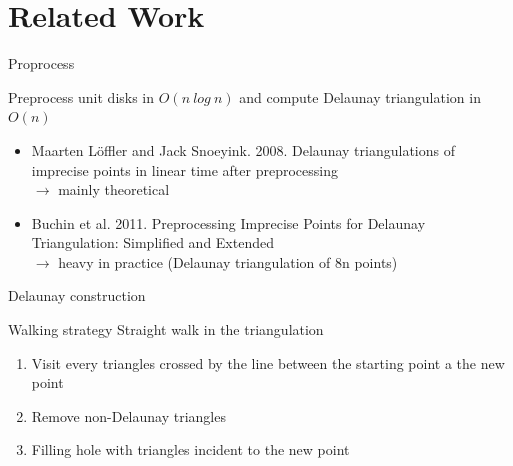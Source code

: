 \documentclass{beamer}
\begin{document}
\section{Related Work}
\frame{\tableofcontents[currentsection]}
\begin{frame}{Proprocess}
 \begin{block}{Preprocess unit disks in $O(n~log~n)$ and compute Delaunay triangulation in $O(n)$}
  \begin{itemize}
   \item Maarten L\"offler and Jack Snoeyink. 2008. Delaunay triangulations of imprecise points in linear time after preprocessing \\
   $\rightarrow$ mainly theoretical 
   \item Buchin et al. 2011. Preprocessing Imprecise Points for Delaunay Triangulation: Simplified and Extended \\
   $\rightarrow$ heavy in practice (Delaunay triangulation of 8n points)
  \end{itemize}
 \end{block}
 
\end{frame}

\begin{frame}{Delaunay construction}
 \begin{block}{Walking strategy}
  Straight walk in the triangulation
  \begin{enumerate}
   \item Visit every triangles crossed by the line between the starting point a the new point
   \item Remove non-Delaunay triangles
   \item Filling hole with triangles incident to the new point
  \end{enumerate}

 \end{block}
\end{frame}
\end{document}
